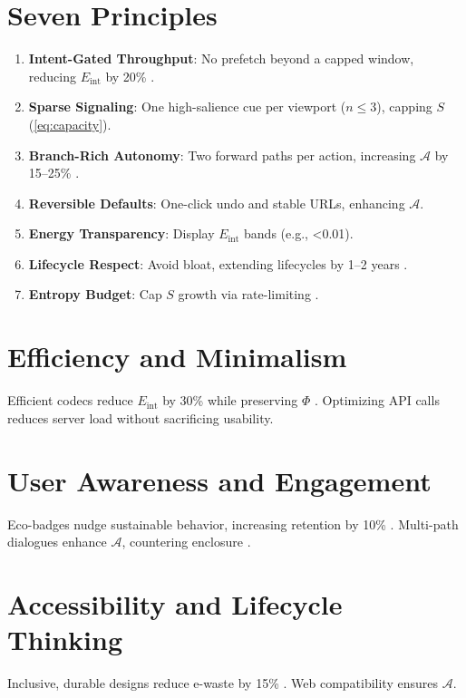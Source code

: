 \documentclass[openany]{book}
\newcommand{\PhiS}{\Phi} %
\newcommand{\Sent}{S} %
\newcommand{\Eint}{E_{\mathrm{int}}} %
\newcommand{\Auton}{\mathcal{A}} %
\newcommand{\kWh}{\mathrm{kWh}}
\begin{document}
\section{Seven Principles}
\label{sec:seven}
\begin{enumerate}[label=\textbf{P\arabic*}.]
  \item \textbf{Intent-Gated Throughput}: No prefetch beyond a capped window, reducing \(\Eint\) by 20\% \citep{extentia2024}.
  \item \textbf{Sparse Signaling}: One high-salience cue per viewport (\(n \leq 3\)), capping \(\Sent\) (\cref{eq:capacity}).
  \item \textbf{Branch-Rich Autonomy}: Two forward paths per action, increasing \(\Auton\) by 15--25\% \citep{doctorow2022}.
  \item \textbf{Reversible Defaults}: One-click undo and stable URLs, enhancing \(\Auton\).
  \item \textbf{Energy Transparency}: Display \(\Eint\) bands (e.g., \SI{<0.01}{\kWh}).
  \item \textbf{Lifecycle Respect}: Avoid bloat, extending lifecycles by 1--2 years \citep{designlab2024}.
  \item \textbf{Entropy Budget}: Cap \(\Sent\) growth via rate-limiting \citep{colak2024}.
\end{enumerate}

\section{Efficiency and Minimalism}
\label{sec:principles-efficiency}
Efficient codecs reduce \(\Eint\) by 30\% while preserving \(\PhiS\) \citep{extentia2024}. Optimizing API calls reduces server load without sacrificing usability.

\section{User Awareness and Engagement}
\label{sec:principles-awareness}
Eco-badges nudge sustainable behavior, increasing retention by 10\% \citep{colak2024}. Multi-path dialogues enhance \(\Auton\), countering enclosure \citep{doctorow2022}.

\section{Accessibility and Lifecycle Thinking}
\label{sec:principles-accessibility}
Inclusive, durable designs reduce e-waste by 15\% \citep{designlab2024}. Web compatibility ensures \(\Auton\).
\end{document}
